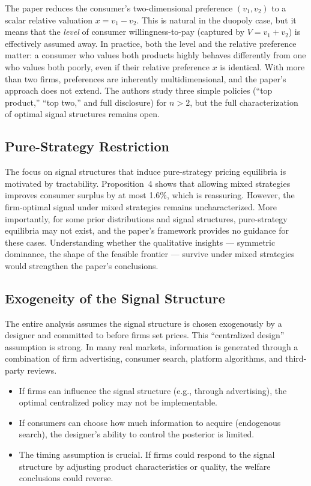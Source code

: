 \documentclass[12pt, a4paper]{article}
\begin{document}
The paper reduces the consumer's two-dimensional preference $(v_1, v_2)$ to a scalar relative valuation $x = v_1 - v_2$. This is natural in the duopoly case, but it means that the \emph{level} of consumer willingness-to-pay (captured by $V = v_1 + v_2$) is effectively assumed away. In practice, both the level and the relative preference matter: a consumer who values both products highly behaves differently from one who values both poorly, even if their relative preference $x$ is identical. With more than two firms, preferences are inherently multidimensional, and the paper's approach does not extend. The authors study three simple policies (``top product,'' ``top two,'' and full disclosure) for $n > 2$, but the full characterization of optimal signal structures remains open.

\subsection{Pure-Strategy Restriction}

The focus on signal structures that induce pure-strategy pricing equilibria is motivated by tractability. Proposition~4 shows that allowing mixed strategies improves consumer surplus by at most 1.6\%, which is reassuring. However, the firm-optimal signal under mixed strategies remains uncharacterized. More importantly, for some prior distributions and signal structures, pure-strategy equilibria may not exist, and the paper's framework provides no guidance for these cases. Understanding whether the qualitative insights --- symmetric dominance, the shape of the feasible frontier --- survive under mixed strategies would strengthen the paper's conclusions.

\subsection{Exogeneity of the Signal Structure}

The entire analysis assumes the signal structure is chosen exogenously by a designer and committed to before firms set prices. This ``centralized design'' assumption is strong. In many real markets, information is generated through a combination of firm advertising, consumer search, platform algorithms, and third-party reviews.
\begin{itemize}[nosep]
    \item If firms can influence the signal structure (e.g., through advertising), the optimal centralized policy may not be implementable.
    \item If consumers can choose how much information to acquire (endogenous search), the designer's ability to control the posterior is limited.
    \item The timing assumption is crucial. If firms could respond to the signal structure by adjusting product characteristics or quality, the welfare conclusions could reverse.
\end{itemize}
\end{document}
